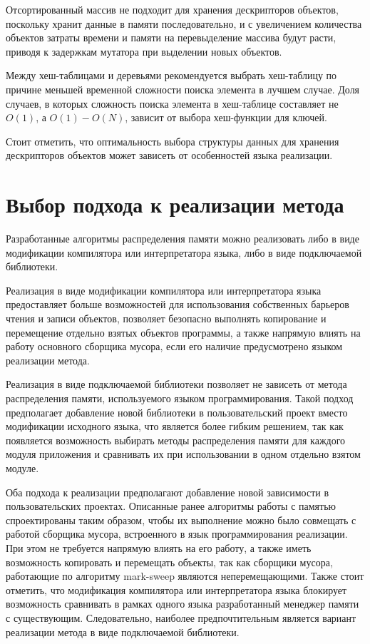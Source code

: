 Отсортированный массив не подходит для хранения дескрипторов объектов, поскольку хранит данные в памяти последовательно, и с увеличением количества объектов затраты времени и памяти на перевыделение массива будут расти, приводя к задержкам мутатора при выделении новых объектов.

Между хеш-таблицами и деревьями рекомендуется выбрать хеш-таблицу по причине меньшей временной сложности поиска элемента в лучшем случае. Доля случаев, в которых сложность поиска элемента в хеш-таблице составляет не $O(1)$, а $O(1)-O(N)$, зависит от выбора хеш-функции для ключей.

Стоит отметить, что оптимальность выбора структуры данных для хранения дескрипторов объектов может зависеть от особенностей языка реализации.

\section{Выбор подхода к реализации метода}

Разработанные алгоритмы распределения памяти можно реализовать либо в виде модификации компилятора или интерпретатора языка, либо в виде подключаемой библиотеки.

Реализация в виде модификации компилятора или интерпретатора языка предоставляет больше возможностей для использования собственных барьеров чтения и записи объектов, позволяет безопасно выполнять копирование и перемещение отдельно взятых объектов программы, а также напрямую влиять на работу основного сборщика мусора, если его наличие предусмотрено языком реализации метода. %
	
Реализация в виде подключаемой библиотеки позволяет не зависеть от метода распределения памяти, используемого языком программирования. Такой подход предполагает добавление новой библиотеки в пользовательский проект вместо модификации исходного языка, что является более гибким решением, так как появляется возможность выбирать методы распределения памяти для каждого модуля приложения и сравнивать их при использовании в одном отдельно взятом модуле.

Оба подхода к реализации предполагают добавление новой зависимости в пользовательских проектах. Описанные ранее алгоритмы работы с памятью спроектированы таким образом, чтобы их выполнение можно было совмещать с работой сборщика мусора, встроенного в язык программирования реализации. При этом не требуется напрямую влиять на его работу, а также иметь возможность копировать и перемещать объекты, так как сборщики мусора, работающие по алгоритму mark-sweep являются неперемещающими. Также стоит отметить, что модификация компилятора или интерпретатора языка блокирует возможность сравнивать в рамках одного языка разработанный менеджер памяти с существующим. Следовательно, наиболее предпочтительным является вариант реализации метода в виде подключаемой библиотеки.

